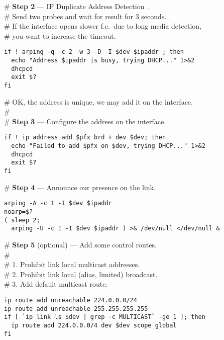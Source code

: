 \begin{flushleft}
\# {\bf Step 2} --- IP Duplicate Address Detection~\cite{RFC-DHCP}.\\
\# Send two probes and wait for result for 3 seconds.\\
\# If the interface opens slower f.e.\ due to long media detection,\\
\# you want to increase the timeout.\\
\end{flushleft}
\begin{verbatim}
if ! arping -q -c 2 -w 3 -D -I $dev $ipaddr ; then
  echo "Address $ipaddr is busy, trying DHCP..." 1>&2
  dhcpcd
  exit $?
fi
\end{verbatim}
\begin{flushleft}
\# OK, the address is unique, we may add it on the interface.\\
\#\\
\# {\bf Step 3} --- Configure the address on the interface.
\end{flushleft}

\begin{verbatim}
if ! ip address add $pfx brd + dev $dev; then
  echo "Failed to add $pfx on $dev, trying DHCP..." 1>&2
  dhcpcd
  exit $?
fi
\end{verbatim}

\noindent\# {\bf Step 4} --- Announce our presence on the link.
\begin{verbatim}
arping -A -c 1 -I $dev $ipaddr
noarp=$?
( sleep 2;
  arping -U -c 1 -I $dev $ipaddr ) >& /dev/null </dev/null &
\end{verbatim}

\begin{flushleft}
\# {\bf Step 5} (optional) --- Add some control routes.\\
\#\\
\# 1. Prohibit link local multicast addresses.\\
\# 2. Prohibit link local (alias, limited) broadcast.\\
\# 3. Add default multicast route.
\end{flushleft}
\begin{verbatim}
ip route add unreachable 224.0.0.0/24 
ip route add unreachable 255.255.255.255
if [ `ip link ls $dev | grep -c MULTICAST` -ge 1 ]; then
  ip route add 224.0.0.0/4 dev $dev scope global
fi
\end{verbatim}

